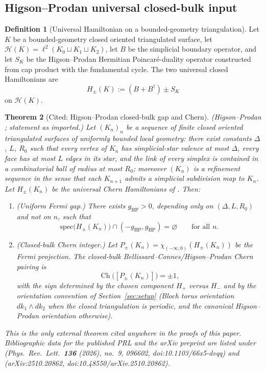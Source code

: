 \documentclass[11pt]{article}
\numberwithin{equation}{section}
\newtheorem{theorem}{Theorem}[section]
\theoremstyle{definition}
\newtheorem{definition}[theorem]{Definition}
\theoremstyle{remark}
\newcommand{\Hil}{\mathcal{H}}
\newcommand{\spec}{\mathrm{spec}}
\newcommand{\Ch}{\operatorname{Ch}}
\begin{document}
\subsection{Higson--Prodan universal closed-bulk input}

\begin{definition}[Universal Hamiltonian on a bounded-geometry triangulation]\label{def:pathb_universal_hamiltonian}
Let \(K\) be a bounded-geometry closed oriented triangulated surface, let
\(\Hil(K)=\ell^2(K_0\sqcup K_1\sqcup K_2)\), let \(B\) be the simplicial boundary operator, and let
\(S_K\) be the Higson--Prodan Hermitian Poincar\'e-duality operator constructed from cap product
with the fundamental cycle. The two universal closed Hamiltonians are
\[
H_\pm(K):=(B+B^\dagger)\pm S_K
\]
on \(\Hil(K)\).
\end{definition}

\begin{theorem}[Cited: Higson--Prodan closed-bulk gap and Chern]\label{thm:hp_imported}
\emph{(Higson--Prodan \cite{HigsonProdanUniversalPRL,HigsonProdanUniversalArxiv}; statement as
imported.)} Let \((K_n)_n\) be a sequence of finite closed oriented triangulated surfaces of
uniformly bounded local geometry: there exist constants \(\Delta\), \(L\), \(R_0\) such that
every vertex of \(K_n\) has simplicial-star valence at most \(\Delta\), every face has at most
\(L\) edges in its star, and the link of every simplex is contained in a combinatorial ball of
radius at most \(R_0\); moreover \((K_n)\) is a refinement sequence in the sense that each
\(K_{n+1}\) admits a simplicial subdivision map to \(K_n\). Let \(H_\pm(K_n)\) be the universal
Chern Hamiltonians of . Then:
\begin{enumerate}[label=(\roman*),leftmargin=2em]
\item (Uniform Fermi gap.) There exists \(g_{\mathrm{HP}}>0\), depending only on
\((\Delta,L,R_0)\) and not on \(n\), such that
\[
\spec\bigl(H_\pm(K_n)\bigr)\cap(-g_{\mathrm{HP}},g_{\mathrm{HP}})=\varnothing
\qquad\text{for all }n.
\]
\item (Closed-bulk Chern integer.) Let
\(P_\pm(K_n)=\chi_{(-\infty,0)}(H_\pm(K_n))\) be the Fermi projection. The closed-bulk
Bellissard--Connes/Higson--Prodan Chern pairing is
\[
\Ch\bigl([P_\pm(K_n)]\bigr)=\pm 1,
\]
with the sign determined by the chosen component \(H_+\) versus \(H_-\) and by the orientation
convention of Section~\ref{sec:setup} (Bloch torus orientation \(dk_1\wedge dk_2\) when the
closed triangulation is periodic, and the canonical Higson--Prodan orientation otherwise).
\end{enumerate}
This is the only external theorem cited anywhere in the proofs of this paper. Bibliographic
data for the published PRL and the arXiv preprint are listed under
\cite{HigsonProdanUniversalPRL} (Phys.\ Rev.\ Lett.\ \textbf{136} (2026), no.~9, 096602,
doi:10.1103/66x5-dvqq) and \cite{HigsonProdanUniversalArxiv} (arXiv:2510.20862,
doi:10.48550/arXiv.2510.20862).
\end{theorem}
\end{document}
